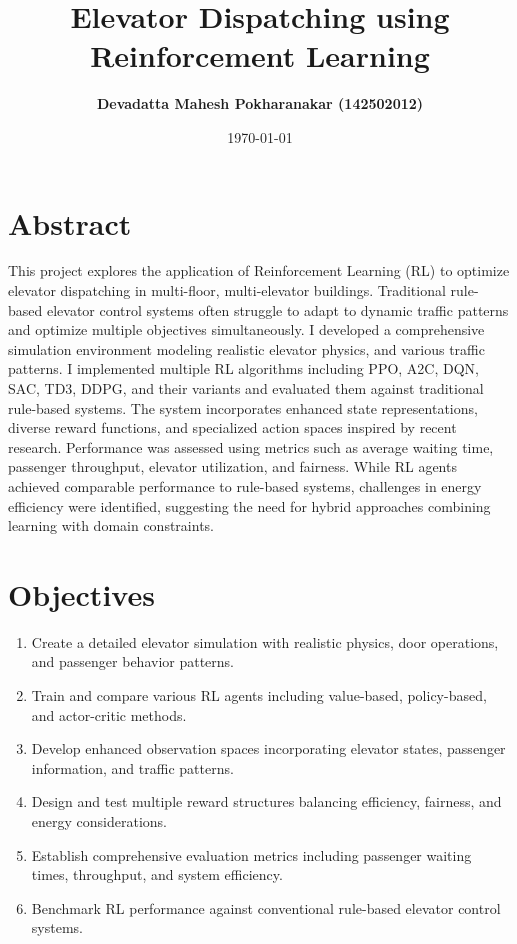 \documentclass[10pt,twocolumn]{article}
\title{\textbf{Elevator Dispatching using Reinforcement Learning}}
\author{
\textbf{Devadatta Mahesh Pokharanakar (142502012)}
}
\date{\today}
\begin{document}
\twocolumn[
\maketitle
]

\section*{Abstract}
This project explores the application of Reinforcement Learning (RL) to optimize elevator dispatching in multi-floor, multi-elevator buildings. Traditional rule-based elevator control systems often struggle to adapt to dynamic traffic patterns and optimize multiple objectives simultaneously. I developed a comprehensive simulation environment modeling realistic elevator physics, and various traffic patterns. I implemented multiple RL algorithms including PPO, A2C, DQN, SAC, TD3, DDPG, and their variants and evaluated them against traditional rule-based systems. The system incorporates enhanced state representations, diverse reward functions, and specialized action spaces inspired by recent research. Performance was assessed using metrics such as average waiting time, passenger throughput, elevator utilization, and fairness. While RL agents achieved comparable performance to rule-based systems, challenges in energy efficiency were identified, suggesting the need for hybrid approaches combining learning with domain constraints.

\section{Objectives}
\begin{enumerate}
    \item Create a detailed elevator simulation with realistic physics, door operations, and passenger behavior patterns.
    \item Train and compare various RL agents including value-based, policy-based, and actor-critic methods.
    \item Develop enhanced observation spaces incorporating elevator states, passenger information, and traffic patterns.
    \item Design and test multiple reward structures balancing efficiency, fairness, and energy considerations.
    \item Establish comprehensive evaluation metrics including passenger waiting times, throughput, and system efficiency.
    \item Benchmark RL performance against conventional rule-based elevator control systems.
\end{enumerate}
\end{document}
